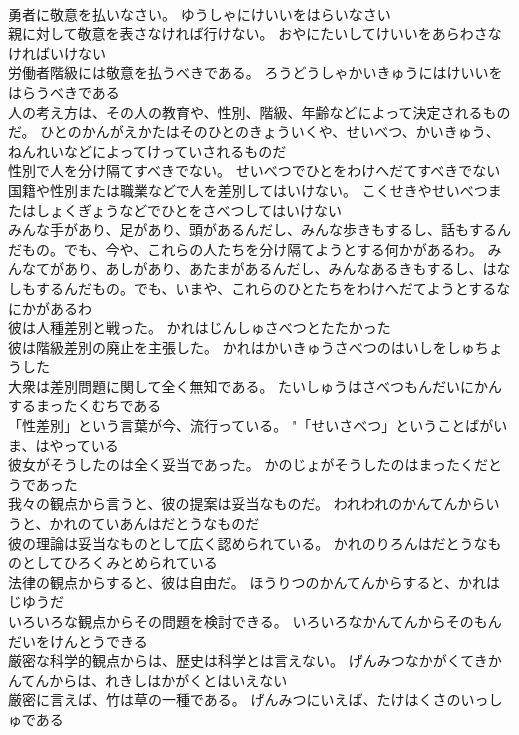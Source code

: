 \documentclass[8pt]{extreport}
\begin{document}
\begin{CJK}{UTF8}{min}
\\	勇者に敬意を払いなさい。	ゆうしゃにけいいをはらいなさい 
\\	親に対して敬意を表さなければ行けない。	おやにたいしてけいいをあらわさなければいけない 
\\	労働者階級には敬意を払うべきである。	ろうどうしゃかいきゅうにはけいいをはらうべきである 
\\	人の考え方は、その人の教育や、性別、階級、年齢などによって決定されるものだ。	ひとのかんがえかたはそのひとのきょういくや、せいべつ、かいきゅう、ねんれいなどによってけっていされるものだ 
\\	性別で人を分け隔てすべきでない。	せいべつでひとをわけへだてすべきでない 
\\	国籍や性別または職業などで人を差別してはいけない。	こくせきやせいべつまたはしょくぎょうなどでひとをさべつしてはいけない 
\\	みんな手があり、足があり、頭があるんだし、みんな歩きもするし、話もするんだもの。でも、今や、これらの人たちを分け隔てようとする何かがあるわ。	みんなてがあり、あしがあり、あたまがあるんだし、みんなあるきもするし、はなしもするんだもの。でも、いまや、これらのひとたちをわけへだてようとするなにかがあるわ 
\\	彼は人種差別と戦った。	かれはじんしゅさべつとたたかった 
\\	彼は階級差別の廃止を主張した。	かれはかいきゅうさべつのはいしをしゅちょうした 
\\	大衆は差別問題に関して全く無知である。	たいしゅうはさべつもんだいにかんするまったくむちである 
\\	「性差別」という言葉が今、流行っている。	"「せいさべつ」ということばがいま、はやっている 
\\	彼女がそうしたのは全く妥当であった。	かのじょがそうしたのはまったくだとうであった 
\\	我々の観点から言うと、彼の提案は妥当なものだ。	われわれのかんてんからいうと、かれのていあんはだとうなものだ 
\\	彼の理論は妥当なものとして広く認められている。	かれのりろんはだとうなものとしてひろくみとめられている 
\\	法律の観点からすると、彼は自由だ。	ほうりつのかんてんからすると、かれはじゆうだ 
\\	いろいろな観点からその問題を検討できる。	いろいろなかんてんからそのもんだいをけんとうできる 
\\	厳密な科学的観点からは、歴史は科学とは言えない。	げんみつなかがくてきかんてんからは、れきしはかがくとはいえない 
\\	厳密に言えば、竹は草の一種である。	げんみつにいえば、たけはくさのいっしゅである 

\end{CJK}
\end{document}

